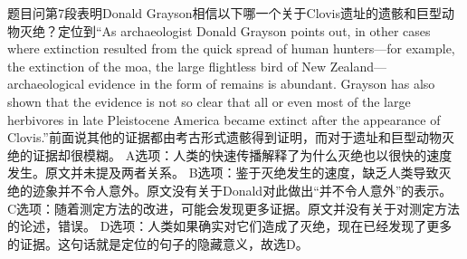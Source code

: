 \begin{blk}
    \begin{nlz}
        题目问第7段表明Donald Grayson相信以下哪一个关于Clovis遗址的遗骸和巨型动物灭绝？定位到“As archaeologist Donald Grayson points out, in other cases where extinction resulted from the quick spread of human hunters—for example, the extinction of the moa, the large flightless bird of New Zealand—archaeological evidence in the form of remains is abundant. Grayson has also shown that the evidence is not so clear that all or even most of the large herbivores in late Pleistocene America became extinct after the appearance of Clovis.”前面说其他的证据都由考古形式遗骸得到证明，而对于遗址和巨型动物灭绝的证据却很模糊。 A选项：人类的快速传播解释了为什么灭绝也以很快的速度发生。原文并未提及两者关系。 B选项：鉴于灭绝发生的速度，缺乏人类导致灭绝的迹象并不令人意外。原文没有关于Donald对此做出“并不令人意外”的表示。 C选项：随着测定方法的改进，可能会发现更多证据。原文并没有关于对测定方法的论述，错误。 D选项：人类如果确实对它们造成了灭绝，现在已经发现了更多的证据。这句话就是定位的句子的隐藏意义，故选D。
    \end{nlz}
\end{blk}

